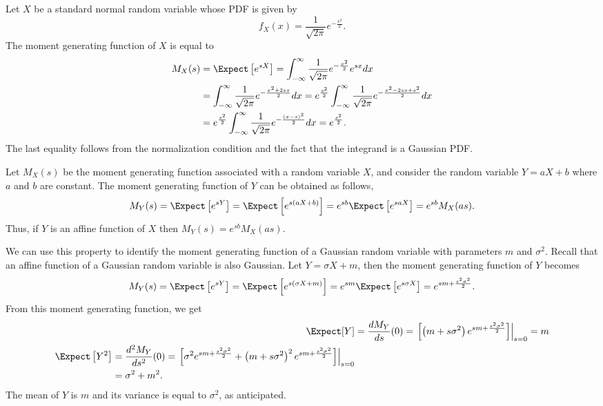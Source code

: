 \begin{example}
Let $X$ be a standard normal random variable whose PDF is given by
\begin{equation*}
f_X (x) = \frac{1}{\sqrt{2 \pi}} e^{- \frac{x^2}{2}}.
\end{equation*}
The moment generating function of $X$ is equal to
\begin{equation*}
\begin{split}
M_X (s) &= \Expect \left[ e^{sX} \right]
= \int_{-\infty}^{\infty} \frac{1}{\sqrt{2 \pi}} e^{-\frac{x^2}{2}} e^{sx} dx \\
&= \int_{-\infty}^{\infty} \frac{1}{\sqrt{2 \pi}} e^{-\frac{x^2 + 2sx}{2}} dx
= e^{\frac{s^2}{2}} \int_{-\infty}^{\infty}
\frac{1}{\sqrt{2 \pi}} e^{-\frac{x^2-2sx+s^2}{2}} dx \\
&= e^{\frac{s^2}{2}} \int_{-\infty}^{\infty}
\frac{1}{\sqrt{2 \pi}} e^{- \frac{(x-s)^2}{2}} dx
= e^{\frac{s^2}{2}} .
\end{split}
\end{equation*}
The last equality follows from the normalization condition and the fact that the integrand is a Gaussian PDF.
\end{example}

Let $M_X(s)$ be the moment generating function associated with a random variable $X$, and consider the random variable $Y = aX + b$ where $a$ and $b$ are constant.
The moment generating function of $Y$ can be obtained as follows,
\begin{equation*}
M_Y (s) = \Expect \left[ e^{sY} \right]
= \Expect \left[ e^{s(aX+b)} \right]
= e^{sb} \Expect \left[ e^{saX} \right]
= e^{sb} M_X (as) .
\end{equation*}
Thus, if $Y$ is an affine function of $X$ then $M_Y (s) = e^{sb} M_X (as)$.

\begin{example}
We can use this property to identify the moment generating function of a Gaussian random variable with parameters $m$ and $\sigma^2$.
Recall that an affine function of a Gaussian random variable is also Gaussian.
Let $Y = \sigma X + m$, then the moment generating function of $Y$ becomes
\begin{equation*}
M_Y (s) = \Expect \left[ e^{sY} \right]
= \Expect \left[ e^{s(\sigma X+m)} \right]
= e^{sm} \Expect \left[ e^{s\sigma X} \right]
= e^{sm + \frac{s^2 \sigma^2}{2} } .
\end{equation*}
From this moment generating function, we get
\begin{align*}
\Expect [Y] &= \frac{d M_Y}{ds} (0)
= \left. \left[ \left(m+s \sigma^2 \right)
e^{sm+\frac{s^2 \sigma^2}{2} } \right] \right|_{s=0} = m \\
\begin{split}
\Expect \left[ Y^2 \right] &= \frac{d^2 M_Y}{ds^2} (0)
= \left. \left[ \sigma^2 e^{sm + \frac{s^2 \sigma^2}{2}}
+ \left(m+s \sigma^2 \right)^2  e^{sm+\frac{s^2 \sigma^2}{2}} \right]
\right|_{s=0} \\
&= \sigma^2 + m^2 .
\end{split}
\end{align*}
The mean of $Y$ is $m$ and its variance is equal to $\sigma^2$, as anticipated.
\end{example}


